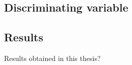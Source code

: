 %
%
%

\subsection*{Discriminating variable}


\subsection*{Results}

\begin{frame}
\begin{center}
\LARGE Results obtained in this thesis?
\end{center}
\end{frame}

